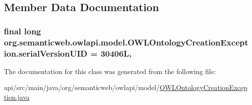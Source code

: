 \subsection{Member Data Documentation}
\hypertarget{classorg_1_1semanticweb_1_1owlapi_1_1model_1_1_o_w_l_ontology_creation_exception_af1fe738fc42bbb69b890c231dea0df34}{
\subsubsection[{serial\-Version\-U\-I\-D}]{\setlength{\rightskip}{0pt plus 5cm}final long org.\-semanticweb.\-owlapi.\-model.\-O\-W\-L\-Ontology\-Creation\-Exception.\-serial\-Version\-U\-I\-D = 30406\-L\hspace{0.3cm}{\ttfamily [static]}, {\ttfamily [private]}}}\label{classorg_1_1semanticweb_1_1owlapi_1_1model_1_1_o_w_l_ontology_creation_exception_af1fe738fc42bbb69b890c231dea0df34}


The documentation for this class was generated from the following file\-:\begin{DoxyCompactItemize}
\item 
api/src/main/java/org/semanticweb/owlapi/model/\hyperlink{_o_w_l_ontology_creation_exception_8java}{O\-W\-L\-Ontology\-Creation\-Exception.\-java}\end{DoxyCompactItemize}
